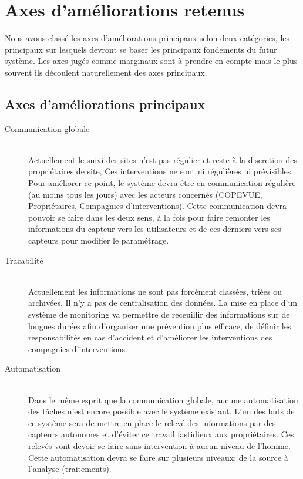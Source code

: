 \section{Axes d'améliorations retenus}

Nous avons classé les axes d'améliorations principaux selon deux catégories, les principaux sur lesquels devront se baser les principaux fondements du futur système. Les axes jugés comme marginaux sont à prendre en compte mais le plus souvent ils découlent naturellement des axes principaux. 

\subsection{Axes d'améliorations principaux}

\begin{description}

	\item[Communication globale]\hfill \\

	Actuellement le suivi des sites n'est pas régulier et reste à la
	discretion des propriétaires de site, Ces interventions ne sont ni
	régulières ni prévisibles. Pour améliorer ce point, le système
	devra être en communication régulière (au moins tous les jours)
	avec les acteurs concernés (COPEVUE, Propriétaires, Compagnies
	d'interventions). Cette communication devra pouvoir se faire dans
	les deux sens, à la fois pour faire remonter les informations du
	capteur vers les utilisateurs et de ces derniers vers ses capteurs
	pour modifier le paramétrage.\\ 

	\item[Tracabilité]\hfill\\

	Actuellement les informations ne sont pas forcément classées,
	triées ou archivées. Il n'y a pas de centralisation des données. La
	mise en place d'un système de monitoring va permettre de receuillir
	des informations sur de longues durées afin d'organiser une
	prévention plus efficace, de définir les responsabilités en cas
	d'accident et d'améliorer les interventions des compagnies
	d'interventions.\\

	\item[Automatisation]\hfill\\
	
	Dans le même esprit que la communication globale, aucune
	automatisation des tâches n'est encore possible avec le système
	existant. L'un des buts de ce système sera de mettre en place le
	relevé des informations par des capteurs autonomes et d'éviter ce
	travail fastidieux aux propriétaires. Ces relevés vont devoir se
	faire sans intervention à aucun niveau de l'homme. Cette
	automatisation devra se faire sur plusieurs niveaux: de la source à
	l'analyse (traitements).\\ 
	

\end{description}
